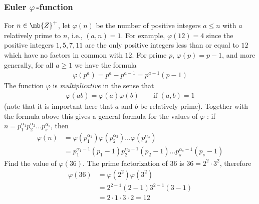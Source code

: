 \subsubsection{Euler \texorpdfstring{$\varphi\,$}{phi}-function}
For $n\in \mb{Z}^{+}$, let $\varphi(n)$ be the number of positive integers $a\le n$
with $a$ relatively prime to $n$, i.e., $(a,n) = 1$. For example, $\varphi(12) = 4$
since the positive integers $1, 5, 7, 11$ are the only positive integers less than or equal to $12$
which have no factors in common with $12$. For prime $p$, $\varphi(p) = p-1$, and more generally,
for all $a\ge 1$ we have the formula
\begin{align*}
    \varphi(p^{a}) = p^{a} - p^{a-1} = p^{a-1}(p-1)
\end{align*}
The function $\varphi$ is {\sl multiplicative} in the sense that
\begin{align*}
    \varphi(ab) = \varphi(a)\varphi(b)\qquad \text{if } (a,b) = 1
\end{align*}
(note that it is important here that $a$ and $b$ be relatively prime).
Together with the formula above this gives a general formula for the values of $\varphi$ : 
if $n=p_{1}^{\alpha_{1}}p_{2}^{\alpha_{2}}\dots p_{s}^{\alpha_{s}}$, then
\begin{align*}
    \varphi(n) &= \varphi(p_{1}^{\alpha_{1}})\varphi(p_{2}^{\alpha_{2}})\dots\varphi(p_{s}^{\alpha_{s}})\\
    &= p_{1}^{\alpha_{1}-1}(p_{1} - 1) p_{2}^{\alpha_{2}-1}(p_{2} - 1)\dots p_{s}^{\alpha_{s}-1}(p_{s} - 1)
\end{align*}
{Find the value of $\varphi(36)$.
}
{
The prime factorization of $36$ is $36 = 2^{2}\cdot 3^{2}$, therefore
\begin{align*}
    \varphi(36) &= \varphi(2^{2})\varphi(3^{2})\\
    &= 2^{2-1}(2-1)3^{2-1}(3-1)\\
    &= 2\cdot 1\cdot 3\cdot 2 = 12
\end{align*}
}

